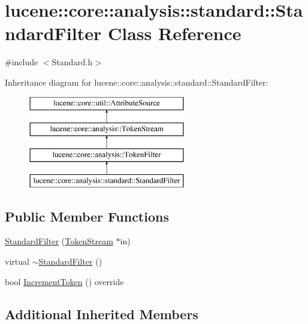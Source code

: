 \hypertarget{classlucene_1_1core_1_1analysis_1_1standard_1_1StandardFilter}{}\section{lucene\+:\+:core\+:\+:analysis\+:\+:standard\+:\+:Standard\+Filter Class Reference}
\label{classlucene_1_1core_1_1analysis_1_1standard_1_1StandardFilter}


{\ttfamily \#include $<$Standard.\+h$>$}

Inheritance diagram for lucene\+:\+:core\+:\+:analysis\+:\+:standard\+:\+:Standard\+Filter\+:\begin{figure}[H]
\begin{center}
\leavevmode
\includegraphics[height=4.000000cm]{classlucene_1_1core_1_1analysis_1_1standard_1_1StandardFilter}
\end{center}
\end{figure}
\subsection*{Public Member Functions}
\begin{DoxyCompactItemize}
\item 
\mbox{\hyperlink{classlucene_1_1core_1_1analysis_1_1standard_1_1StandardFilter_a2463bf01ed63b31b0df14149737e50ae}{Standard\+Filter}} (\mbox{\hyperlink{classlucene_1_1core_1_1analysis_1_1TokenStream}{Token\+Stream}} $\ast$in)
\item 
virtual \mbox{\hyperlink{classlucene_1_1core_1_1analysis_1_1standard_1_1StandardFilter_a0136fab7677e7393491b4075a852751d}{$\sim$\+Standard\+Filter}} ()
\item 
bool \mbox{\hyperlink{classlucene_1_1core_1_1analysis_1_1standard_1_1StandardFilter_a11958d89cb4aed281d083db7be0e8680}{Increment\+Token}} () override
\end{DoxyCompactItemize}
\subsection*{Additional Inherited Members}


